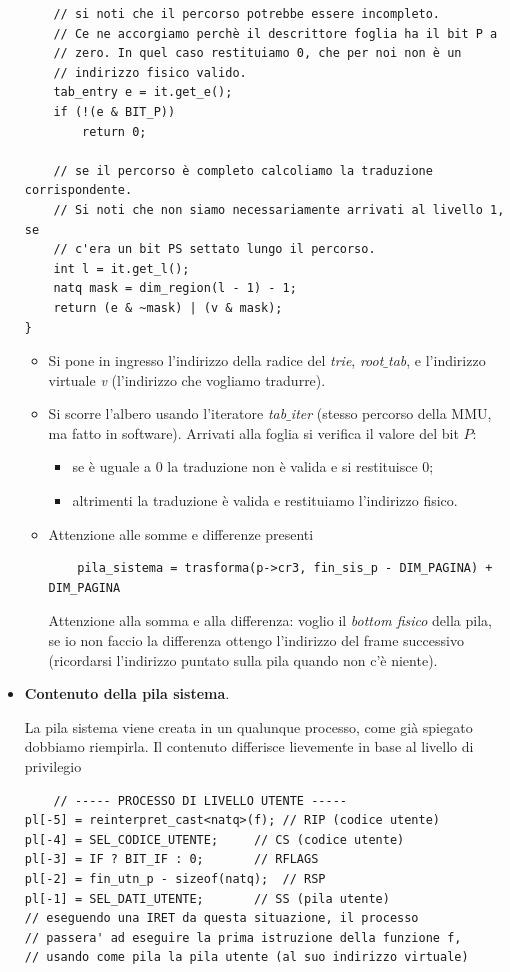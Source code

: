 \documentclass[11pt]{report}
\theoremstyle{definition}
\begin{document}
\begin{itemize}
\begin{verbatim}
    // si noti che il percorso potrebbe essere incompleto.
    // Ce ne accorgiamo perchè il descrittore foglia ha il bit P a
    // zero. In quel caso restituiamo 0, che per noi non è un
    // indirizzo fisico valido.
    tab_entry e = it.get_e();
    if (!(e & BIT_P))
        return 0;
	
    // se il percorso è completo calcoliamo la traduzione corrispondente.
    // Si noti che non siamo necessariamente arrivati al livello 1, se
    // c'era un bit PS settato lungo il percorso.
    int l = it.get_l();
    natq mask = dim_region(l - 1) - 1;
    return (e & ~mask) | (v & mask);
}
\end{verbatim}
\normalsize
\begin{itemize}
	\item Si pone in ingresso l'indirizzo della radice del \emph{trie}, \emph{root$\_$tab}, e l'indirizzo virtuale \emph{v} (l'indirizzo che vogliamo tradurre).
	\item Si scorre l'albero usando l'iteratore \emph{tab$\_$iter} (stesso percorso della MMU, ma fatto in software). Arrivati alla foglia si verifica il valore del bit $P$:
	\begin{itemize}
		\item se è uguale a $0$ la traduzione non è valida e si restituisce 0;
		\item altrimenti la traduzione è valida e restituiamo l'indirizzo fisico.
	\end{itemize} 
\item Attenzione alle somme e differenze presenti
\begin{verbatim}
	pila_sistema = trasforma(p->cr3, fin_sis_p - DIM_PAGINA) + DIM_PAGINA\end{verbatim}
Attenzione alla somma e alla differenza: voglio il \textit{bottom fisico} della pila, se io non faccio la differenza ottengo l'indirizzo del frame successivo (ricordarsi l'indirizzo puntato sulla pila quando non c'è niente).
\end{itemize}

\item \textbf{Contenuto della pila sistema}. 

La pila sistema viene creata in un qualunque processo, come già spiegato dobbiamo riempirla. Il contenuto differisce lievemente in base al livello di privilegio 
\small
\begin{verbatim}
	// ----- PROCESSO DI LIVELLO UTENTE -----
pl[-5] = reinterpret_cast<natq>(f); // RIP (codice utente)
pl[-4] = SEL_CODICE_UTENTE;	    // CS (codice utente)
pl[-3] = IF ? BIT_IF : 0;	    // RFLAGS
pl[-2] = fin_utn_p - sizeof(natq);  // RSP
pl[-1] = SEL_DATI_UTENTE;	    // SS (pila utente)
// eseguendo una IRET da questa situazione, il processo
// passera' ad eseguire la prima istruzione della funzione f,
// usando come pila la pila utente (al suo indirizzo virtuale)


\end{verbatim}
\end{itemize}
\end{document}
